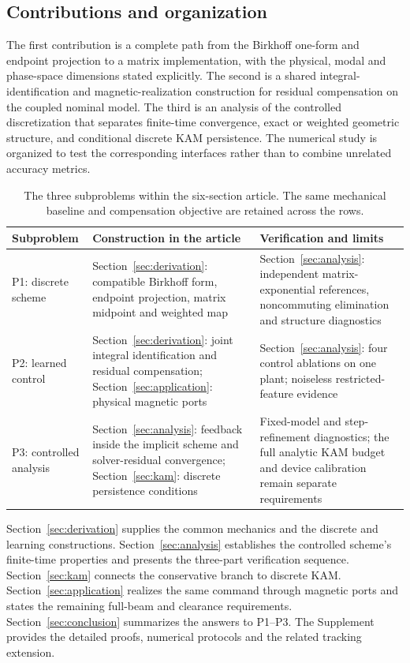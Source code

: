 \subsection{Contributions and organization}
The first contribution is a complete path from the Birkhoff one-form and endpoint projection to a matrix implementation, with the physical, modal and phase-space dimensions stated explicitly. The second is a shared integral-identification and magnetic-realization construction for residual compensation on the coupled nominal model. The third is an analysis of the controlled discretization that separates finite-time convergence, exact or weighted geometric structure, and conditional discrete KAM persistence. The numerical study is organized to test the corresponding interfaces rather than to combine unrelated accuracy metrics.

\begin{table}[t]
\centering
\caption{The three subproblems within the six-section article. The same mechanical baseline and compensation objective are retained across the rows.}
\label{tab:roadmap}
\begin{tabularx}{\textwidth}{p{}YY}
\toprule
Subproblem & Construction in the article & Verification and limits\\
\midrule
P1: discrete scheme & Section~\ref{sec:derivation}: compatible Birkhoff form, endpoint projection, matrix midpoint and weighted map & Section~\ref{sec:analysis}: independent matrix-exponential references, noncommuting elimination and structure diagnostics\\
P2: learned control & Section~\ref{sec:derivation}: joint integral identification and residual compensation; Section~\ref{sec:application}: physical magnetic ports & Section~\ref{sec:analysis}: four control ablations on one plant; noiseless restricted-feature evidence\\
P3: controlled analysis & Section~\ref{sec:analysis}: feedback inside the implicit scheme and solver-residual convergence; Section~\ref{sec:kam}: discrete persistence conditions & Fixed-model and step-refinement diagnostics; the full analytic KAM budget and device calibration remain separate requirements\\
\bottomrule
\end{tabularx}
\end{table}

Section~\ref{sec:derivation} supplies the common mechanics and the discrete and learning constructions. Section~\ref{sec:analysis} establishes the controlled scheme's finite-time properties and presents the three-part verification sequence. Section~\ref{sec:kam} connects the conservative branch to discrete KAM. Section~\ref{sec:application} realizes the same command through magnetic ports and states the remaining full-beam and clearance requirements. Section~\ref{sec:conclusion} summarizes the answers to P1--P3. The Supplement provides the detailed proofs, numerical protocols and the related tracking extension.
